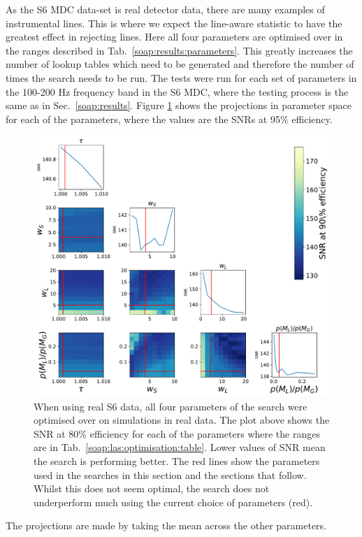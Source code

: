 As the S6 \gls{MDC} data-set is real detector data, there are many examples of instrumental lines. 
This is where we expect the line-aware statistic to have the greatest effect in rejecting lines. 
Here all four parameters are optimised over in the ranges described in Tab.~\ref{soap:results:parameters}. 
This greatly increases the number of lookup tables which need to be generated and therefore the number of times the search needs to be run.
The tests were run for each set of parameters in the 100-200 Hz frequency band in the S6 \gls{MDC}, where the testing process is the same as in Sec.~\ref{soap:results}.
Figure \ref{soap:las:optimisation:s6mdcplot} shows the projections in parameter space for each of the parameters, where the values are the \glspl{SNR} at 95\% efficiency.  
%
%
\begin{figure}[p]
    \centering
    \includegraphics[width=\linewidth]{C3_soap/s6_optimised.pdf}
    \caption[Optimisation of line aware statistic in real S6 data.]{When using real S6 data, all four parameters of the search were optimised over on simulations in real data. The plot above shows the \gls{SNR} at 80\% efficiency for each of the parameters where the ranges are in Tab.~\ref{soap:las:optimisation:table}. Lower values of \gls{SNR} mean the search is performing better. The red lines show the parameters used in the searches in this section and the sections that follow. Whilst this does not seem optimal, the search does not underperform much using the current choice of parameters (red). }
    \label{soap:las:optimisation:s6mdcplot}
\end{figure}
%
%
The projections are made by taking the mean across the other parameters.


